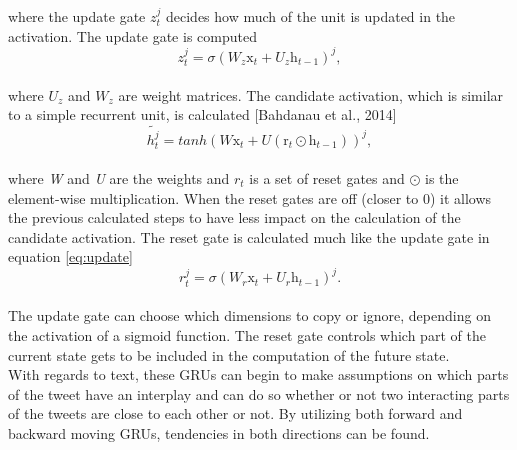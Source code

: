 where the update gate $z_{t}^{j}$ decides how much of the unit is updated in the activation. The update gate is computed\\

\begin{equation}\label{eq:update}
z_{t}^{j}=\sigma\left(W_{z}\mathrm{x}_{t}+U_{z}\mathrm{h}_{t-1}\right)^{j},
\end{equation}\\

where $U_{z}$ and $W_{z}$ are weight matrices. The candidate activation, which is similar to a simple recurrent unit, is calculated [Bahdanau et al., 2014]\\

\begin{equation} \label{eq:candidate}
\tilde{h_{t}^{j}} = tanh\left(W\mathrm{x}_{t}+U\left(\mathrm{r}_{t}\odot\mathrm{h}_{t-1}\right)\right)^{j},
\end{equation}\\

where \textit{W} and \textit{U} are the weights and $r_{t}$ is a set of reset gates and $\odot$ is the element-wise multiplication. When the reset gates are off (closer to 0) it allows the previous calculated steps to have less impact on the calculation of the candidate activation. The reset gate is calculated much like the update gate in equation \ref{eq:update}\\

\begin{equation}\label{eq:reset}
r_{t}^{j}=\sigma\left(W_{r}\mathrm{x}_{t}+U_{r}\mathrm{h}_{t-1}\right)^{j}.
\end{equation}\\

The update gate can choose which dimensions to copy or ignore, depending on the activation of a sigmoid function. The reset gate controls which part of the current state gets to be included in the computation of the future state.\\
With regards to text, these GRUs can begin to make assumptions on which parts of the tweet have an interplay and can do so whether or not two interacting parts of the tweets are close to each other or not. By utilizing both forward and backward moving GRUs, tendencies in both directions can be found.


